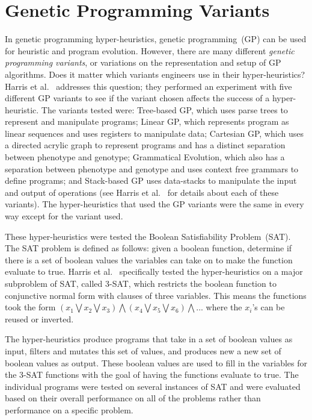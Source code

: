 \documentclass{sig-alternate}
\begin{document}
\section{Genetic Programming Variants}
\label{sec:gpvariants}
In genetic programming hyper-heuristics, genetic programming~(GP) can be used for heuristic and program evolution. However, there are many different \textit{genetic programming variants}, or variations on the representation and setup of GP algorithms. Does it matter which variants engineers use in their hyper-heuristics? Harris et al.~\cite{harris:2015} addresses this question; they performed an experiment with five different GP variants to see if the variant chosen affects the success of a hyper-heuristic. The variants tested were: Tree-based GP, which uses parse trees to represent and manipulate programs; Linear GP, which represents program as linear sequences and uses registers to manipulate data; Cartesian GP, which uses a directed acrylic graph to represent programs and has a distinct separation between phenotype and genotype; Grammatical Evolution, which also has a separation between phenotype and genotype and uses context free grammars to define programs; and Stack-based GP uses data-stacks to manipulate the input and output of operations (see Harris et al.~\cite{harris:2015} for details about each of these variants). The hyper-heuristics that used the GP variants were the same in every way except for the variant used. 

These hyper-heuristics were tested the Boolean Satisfiability Problem~(SAT). The SAT problem is defined as follows: given a boolean function, determine if there is a set of boolean values the variables can take on to make the function evaluate to true. Harris et al.~\cite{harris:2015} specifically tested the hyper-heuristics on a major subproblem of SAT, called 3-SAT, which restricts the boolean function to conjunctive normal form with clauses of three variables. This means the functions took the form $(x_{1} \bigvee x_{2} \bigvee x_{3}) \bigwedge (x_{4} \bigvee x_{5} \bigvee x_{6}) \bigwedge ...$ where the $x_{i}$'s can be reused or inverted.

The hyper-heuristics produce programs that take in a set of boolean values as input, filters and mutates this set of values, and produces new a new set of boolean values as output. These boolean values are used to fill in the variables for the 3-SAT functions with the goal of having the functions evaluate to true. The individual programs were tested on several instances of SAT and were evaluated based on their overall performance on all of the problems rather than performance on a specific problem.
\end{document}

